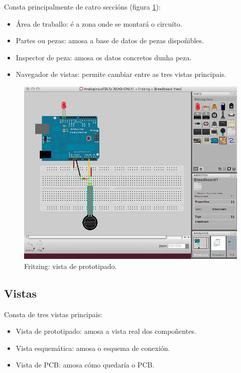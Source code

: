  Consta principalmente de catro seccións (figura \ref{figura:FritzingBB}):

 \begin{itemize}
  \item Área de traballo: é a zona onde se montará o circuíto.
  \item Partes ou pezas: amosa a base de datos de pezas dispoñibles.
  \item Inspector de peza: amosa os datos concretos dunha peza.
  \item Navegador de vistas: permite cambiar entre as tres vistas principais.
 \end{itemize}

 \begin{figure}[htbp]
  \centering
  \includegraphics[scale=0.3,keepaspectratio=true]{./imagenes/fritzing-bb.jpg}
  \caption{Fritzing: vista de prototipado.}
  \label{figura:FritzingBB}
 \end{figure}

 \subsection{Vistas}

 Consta de tres vistas principais:

 \begin{itemize}
  \item Vista de prototipado: amosa a vista real dos compoñentes.
  \item Vista esquemática: amosa o esquema de conexión.
  \item Vista de PCB: amosa cómo quedaría o PCB.
 \end{itemize}


